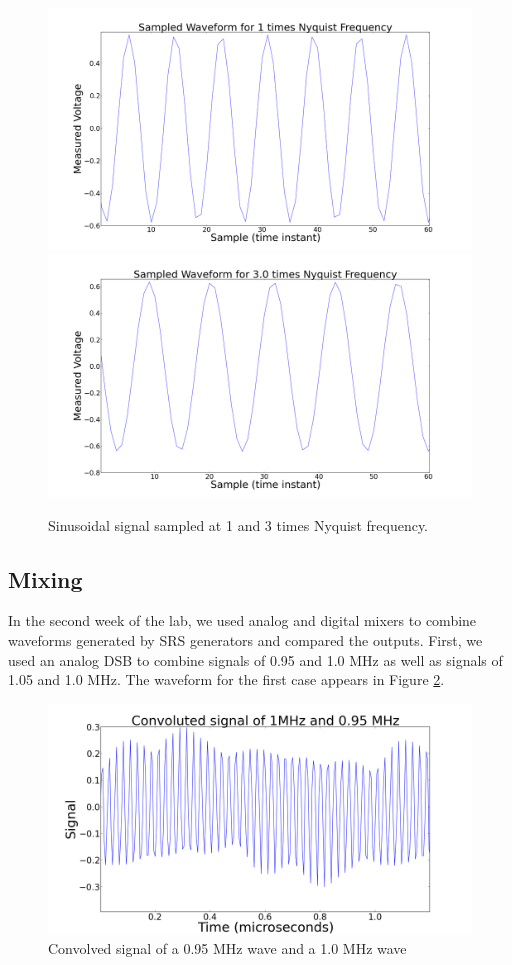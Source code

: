 \documentclass[11pt]{article}
\begin{document}
\begin{figure}
\centering
\includegraphics[scale=0.35]{pictures/onetimesnyq}
\includegraphics[scale=0.35]{pictures/triplenyq}
\caption{Sinusoidal signal sampled at 1 and 3
  times Nyquist frequency. \label{nyqg}}
\end{figure}
\subsection{Mixing}

In the second week of the lab, we used analog and digital mixers to combine waveforms generated by SRS generators and compared the outputs. First, we used an analog DSB to combine signals of 0.95 and 1.0 MHz as well as signals of 1.05 and 1.0 MHz. The waveform for the first case appears in Figure \ref{wavenine}. 

\begin{figure}
\includegraphics[scale=0.45]{pictures/signalninefive}
\caption{Convolved signal of a 0.95 MHz wave and a 1.0 MHz wave \label{wavenine}}
\end{figure}
\end{document}
